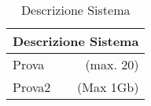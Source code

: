 \newpage	
	
\begin{table}[h]
	\begin{center}
		  \begin{tabular}{|p{}|r|}
		 \hline
			\multicolumn{2}{|c|}{\textbf{Descrizione Sistema}}\\
		 \hline
		Prova & (max. 20)\\
		Prova2 & (Max 1Gb) \\
		
		\hline %
		\end{tabular}
	\caption{Descrizione Sistema} %
	\label{tabdescrsistema}
	\end{center}	
\end{table}


